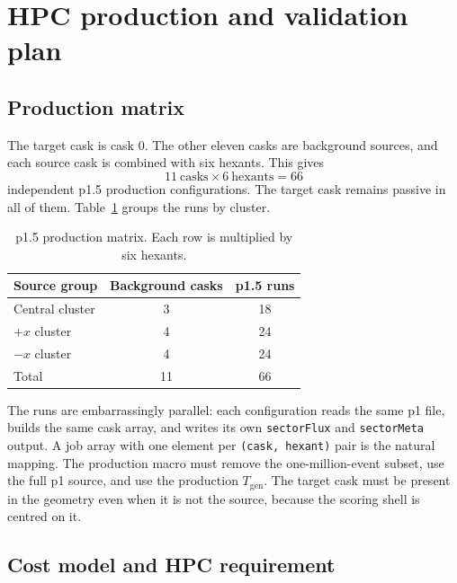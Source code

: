 \documentclass[11pt,a4paper]{article}
\begin{document}
\section{HPC production and validation plan}

\subsection{Production matrix}

The target cask is cask 0. The other eleven casks are background sources, and
each source cask is combined with six hexants. This gives
\begin{equation}
  11\ \text{casks}\times 6\ \text{hexants}=66
\end{equation}
independent p1.5 production configurations. The target cask remains passive in
all of them. Table~\ref{tab:matrix} groups the runs by cluster.

\begin{table}[H]
  \centering
  \caption{p1.5 production matrix. Each row is multiplied by six hexants.}
  \label{tab:matrix}
  \begin{tabular}{@{}lcc@{}}
    \toprule
    Source group & Background casks & p1.5 runs \\
    \midrule
    Central cluster & 3 & 18 \\
    $+x$ cluster & 4 & 24 \\
    $-x$ cluster & 4 & 24 \\
    \midrule
    Total & 11 & 66 \\
    \bottomrule
  \end{tabular}
\end{table}

The runs are embarrassingly parallel: each configuration reads the same p1
file, builds the same cask array, and writes its own \texttt{sectorFlux} and
\texttt{sectorMeta} output. A job array with one element per
\texttt{(cask, hexant)} pair is the natural mapping. The production macro must
remove the one-million-event subset, use the full p1 source, and use the
production $T_{\mathrm{gen}}$. The target cask must be present in the geometry
even when it is not the source, because the scoring shell is centred on it.

\subsection{Cost model and HPC requirement}
\end{document}
